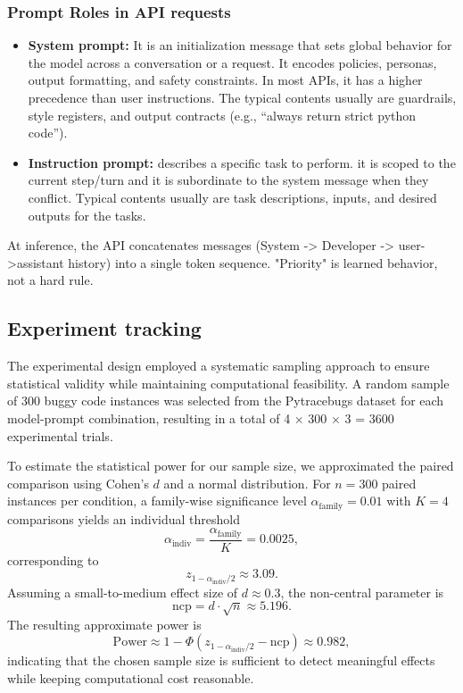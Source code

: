 \subsubsection{Prompt Roles in API requests}
\begin{itemize}
    \item \textbf{System prompt:} It is an initialization message that sets global behavior for the model across a conversation or a request. It encodes policies, personas, output formatting, and safety constraints. In most APIs, it has a higher precedence than user instructions. The typical contents usually are guardrails, style registers, and output contracts (e.g., ``always return strict python code'').
    \item \textbf{Instruction prompt:} describes a specific task to perform. it is scoped to the current step/turn and it is subordinate to the system message when they conflict. Typical contents usually are task descriptions, inputs, and desired outputs for the tasks.
\end{itemize}

At inference, the API concatenates messages (System -> Developer -> user->assistant history) into a single token sequence. "Priority" is learned behavior, not a hard rule.

\subsection{Experiment tracking}
The experimental design employed a systematic sampling approach to ensure statistical validity while maintaining computational feasibility. A random sample of 300 buggy code instances was selected from the Pytracebugs dataset for each model-prompt combination, resulting in a total of 4 × 300 × 3 = 3600 experimental trials.

To estimate the statistical power for our sample size, we approximated the paired comparison using Cohen's $d$ and a normal distribution. For $n=300$ paired instances per condition, a family-wise significance level $\alpha_\text{family}=0.01$ with $K=4$ comparisons yields an individual threshold
\[
\alpha_\text{indiv} = \frac{\alpha_\text{family}}{K} = 0.0025,
\]
corresponding to
\[
z_{1-\alpha_\text{indiv}/2} \approx 3.09.
\]
Assuming a small-to-medium effect size of $d \approx 0.3$, the non-central parameter is
\[
\text{ncp} = d \cdot \sqrt{n} \approx 5.196.
\]
The resulting approximate power is
\[
\text{Power} \approx 1 - \Phi(z_{1-\alpha_\text{indiv}/2} - \text{ncp}) \approx 0.982,
\]
indicating that the chosen sample size is sufficient to detect meaningful effects while keeping computational cost reasonable.


